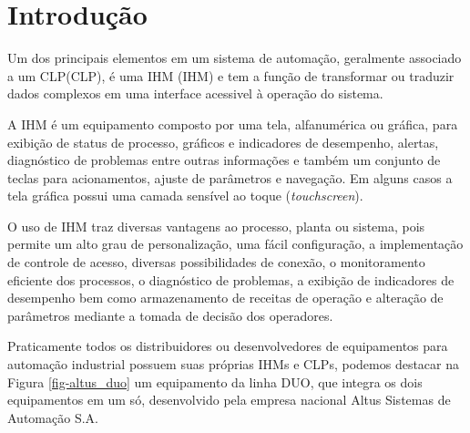 \chapter{Introdução}
\label{cap:introducao}

Um dos principais elementos em um sistema de automação, geralmente associado a um \acrlong{CLP}(\acrshort{CLP}), é uma \acrlong{IHM} (\acrshort{IHM}) e tem a função de transformar ou traduzir dados complexos em uma interface acessivel à operação do sistema. 

A \acrshort{IHM} é um equipamento composto por uma tela, alfanumérica ou gráfica, para exibição de status de processo, gráficos e indicadores de desempenho, alertas, diagnóstico de problemas entre outras informações e também um conjunto de teclas para acionamentos, ajuste de parâmetros e navegação. Em alguns casos a tela gráfica possui uma camada sensível ao toque (\textit{touchscreen}).

O uso de \acrshort{IHM} traz diversas vantagens ao processo, planta ou sistema, pois permite um alto grau de personalização, uma fácil configuração, a implementação de controle de acesso, diversas possibilidades de conexão, o monitoramento eficiente dos processos, o diagnóstico de problemas, a exibição de indicadores de desempenho bem como armazenamento de receitas de operação e alteração de parâmetros mediante a tomada de decisão dos operadores. 

Praticamente todos os distribuidores ou desenvolvedores de equipamentos para automação industrial possuem suas próprias \acrshort{IHM}s e \acrshort{CLP}s, podemos destacar na Figura \ref{fig-altus_duo} um equipamento da linha DUO, que integra os dois equipamentos em um só, desenvolvido pela empresa nacional Altus Sistemas de Automação S.A.

\begin{figure}[h!]
	\centering
\end{figure}


